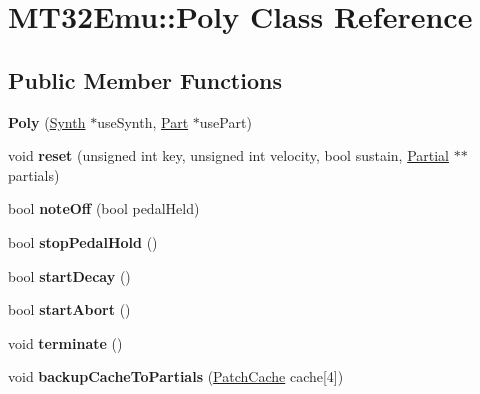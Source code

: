 \hypertarget{classMT32Emu_1_1Poly}{\section{M\-T32\-Emu\-:\-:Poly Class Reference}
\label{classMT32Emu_1_1Poly}
}
\subsection*{Public Member Functions}
\begin{DoxyCompactItemize}
\item 
\hypertarget{classMT32Emu_1_1Poly_afb848e178236dff686db60b5a682abae}{{\bfseries Poly} (\hyperlink{classMT32Emu_1_1Synth}{Synth} $\ast$use\-Synth, \hyperlink{classMT32Emu_1_1Part}{Part} $\ast$use\-Part)}\label{classMT32Emu_1_1Poly_afb848e178236dff686db60b5a682abae}

\item 
\hypertarget{classMT32Emu_1_1Poly_aecaaceae0cb47364592b42a091e89955}{void {\bfseries reset} (unsigned int key, unsigned int velocity, bool sustain, \hyperlink{classMT32Emu_1_1Partial}{Partial} $\ast$$\ast$partials)}\label{classMT32Emu_1_1Poly_aecaaceae0cb47364592b42a091e89955}

\item 
\hypertarget{classMT32Emu_1_1Poly_a0ad7f5d7e7f95769c47610355149513a}{bool {\bfseries note\-Off} (bool pedal\-Held)}\label{classMT32Emu_1_1Poly_a0ad7f5d7e7f95769c47610355149513a}

\item 
\hypertarget{classMT32Emu_1_1Poly_a3b839a952541e8bc964947cb3fc6a107}{bool {\bfseries stop\-Pedal\-Hold} ()}\label{classMT32Emu_1_1Poly_a3b839a952541e8bc964947cb3fc6a107}

\item 
\hypertarget{classMT32Emu_1_1Poly_a01582ab16b2130191ba05200ff653796}{bool {\bfseries start\-Decay} ()}\label{classMT32Emu_1_1Poly_a01582ab16b2130191ba05200ff653796}

\item 
\hypertarget{classMT32Emu_1_1Poly_a131eef106138ff8091cbbefce42ee3a1}{bool {\bfseries start\-Abort} ()}\label{classMT32Emu_1_1Poly_a131eef106138ff8091cbbefce42ee3a1}

\item 
\hypertarget{classMT32Emu_1_1Poly_a2c710523168e79cdee9c8c92b5211f33}{void {\bfseries terminate} ()}\label{classMT32Emu_1_1Poly_a2c710523168e79cdee9c8c92b5211f33}

\item 
\hypertarget{classMT32Emu_1_1Poly_adc439acb3fb8e91479f8c01e13c9953d}{void {\bfseries backup\-Cache\-To\-Partials} (\hyperlink{structMT32Emu_1_1PatchCache}{Patch\-Cache} cache\mbox{[}4\mbox{]})}\label{classMT32Emu_1_1Poly_adc439acb3fb8e91479f8c01e13c9953d}


\end{DoxyCompactItemize}
